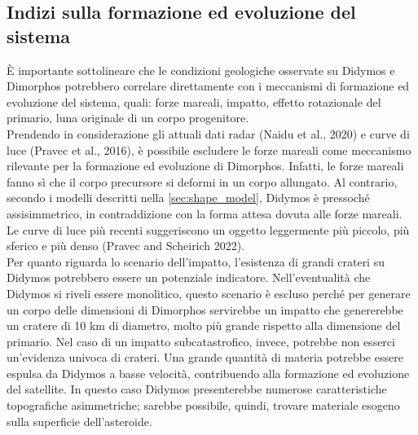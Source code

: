 \documentclass[a4paper,11pt,openright]{book}
\begin{document}
\subsection{Indizi sulla formazione ed evoluzione del sistema}
È importante sottolineare che le condizioni geologiche osservate su Didymos e Dimorphos potrebbero correlare direttamente con i meccanismi di formazione ed evoluzione del sistema, quali: forze mareali, impatto, effetto rotazionale del primario, luna originale di un corpo progenitore.\\
Prendendo in considerazione gli attuali dati radar (Naidu et al., 2020) e curve di luce (Pravec et al., 2016), è possibile escludere le forze mareali come meccanismo rilevante per la formazione ed evoluzione di Dimorphos. Infatti, le forze mareali fanno sì che il corpo precursore si deformi in un corpo allungato. Al contrario, secondo i modelli descritti nella \cref{sec:shape_model}, Didymos è pressoché assisimmetrico, in contraddizione con la forma attesa dovuta alle forze mareali. Le curve di luce più recenti suggeriscono un oggetto leggermente più piccolo, più sferico e più denso (Pravec and Scheirich 2022).\\
Per quanto riguarda lo scenario dell'impatto, l'esistenza di grandi crateri su Didymos potrebbero essere un potenziale indicatore. Nell'eventualità che Didymos si riveli essere monolitico, questo scenario è escluso perché per generare un corpo delle dimensioni di Dimorphos servirebbe un impatto che genererebbe un cratere di 10 km di diametro, molto più grande rispetto alla dimensione del primario. Nel caso di un impatto subcatastrofico, invece, potrebbe non esserci un'evidenza univoca di crateri. Una grande quantità di materia potrebbe essere espulsa da Didymos a basse velocità, contribuendo alla formazione ed evoluzione del satellite. In questo caso Didymos presenterebbe numerose caratteristiche topografiche asimmetriche; sarebbe possibile, quindi, trovare materiale esogeno sulla superficie dell'asteroide.\\
\end{document}

